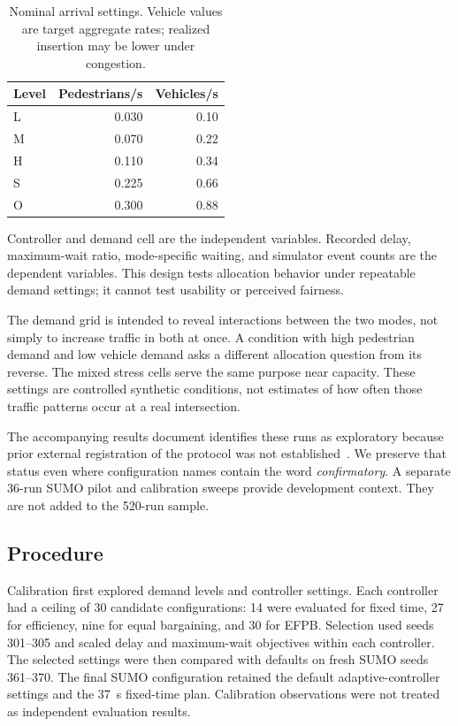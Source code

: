 \documentclass[sigconf]{acmart}
\begin{document}
\begin{table}[!htbp]
\caption{Nominal arrival settings. Vehicle values are target aggregate rates; realized insertion may be lower under congestion.}
\label{tab:demand}
\small
\begin{tabular*}{\columnwidth}{@{\extracolsep{\fill}}lrr@{}}
\toprule
Level & Pedestrians/s & Vehicles/s\\
\midrule
L & 0.030 & 0.10\\
M & 0.070 & 0.22\\
H & 0.110 & 0.34\\
S & 0.225 & 0.66\\
O & 0.300 & 0.88\\
\bottomrule
\end{tabular*}
\end{table}

Controller and demand cell are the independent variables. Recorded
delay, maximum-wait ratio, mode-specific waiting, and simulator
event counts are the dependent variables. This design tests
allocation behavior under repeatable demand settings; it cannot
test usability or perceived fairness.

The demand grid is intended to reveal interactions between the two
modes, not simply to increase traffic in both at once. A condition
with high pedestrian demand and low vehicle demand asks a
different allocation question from its reverse. The mixed stress
cells serve the same purpose near capacity. These settings are
controlled synthetic conditions, not estimates of how often those
traffic patterns occur at a real intersection.

The accompanying results document identifies these runs as
exploratory because prior external registration of the protocol was
not established~\cite{resultsreport}. We preserve that status even
where configuration names contain the word \emph{confirmatory}.
A separate 36-run SUMO pilot and calibration sweeps provide
development context. They are not added to the 520-run sample.

\subsection{Procedure}
Calibration first explored demand levels and controller settings.
Each controller had a ceiling of 30 candidate configurations:
14 were evaluated for fixed time, 27 for efficiency, nine for equal
bargaining, and 30 for EFPB. Selection used seeds 301--305 and
scaled delay and maximum-wait objectives within each controller.
The selected settings were then compared with defaults on fresh
SUMO seeds 361--370. The final SUMO configuration retained the
default adaptive-controller settings and the 37~s fixed-time plan.
Calibration observations were not treated as independent evaluation
results.
\end{document}
